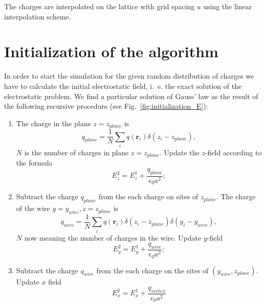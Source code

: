 \documentclass[a4paper, 12pt]{article}
\newcommand{\vect}[1]{\mathbf{#1}}
\begin{document}
The charges are interpolated on the lattice
with grid spacing $a$ using the linear interpolation scheme.
%
\section{Initialization of the algorithm}
%
In order to start the simulation for the given random distribution of
charges we have to calculate the initial electrostatic field, i.~e. the
exact solution of the electrostatic problem. We find a particular solution of Gauss' law as
the result of the following recursive procedure (see
Fig.~\ref{fig:initialization_E}):
\begin{enumerate}

\item The charge in the plane $z=z_{plane}$ is 
\begin{equation}
q_{plane}=\frac{1}{N}\sum_iq(\vect r_i)\delta(z_i-z_{plane}),
\end{equation}
$N$ is the number of charges in plane $z=z_{plane}$. Update the
$z$-field according to the formula
\begin{equation}
E_z^2=E_z^1+\frac{q_{plane}}{\epsilon_0a^2};
\end{equation}
 \item Subtract the
charge $q_{plane}$ from the each charge on sites of $z_{plane}$. The
charge of the wire $y=y_{wire}, z=z_{plane}$ is
\begin{equation}
q_{wire}=\frac{1}{N}\sum_iq(\vect r_i)\delta(z_i-z_{plane})\delta(y_i-y_{wire}),
\end{equation}
 $N$ now meaning the
number of charges in the wire. Update $y$-field
\begin{equation}
E_y^2=E_y^1+\frac{q_{wire}}{\epsilon_0a^2};
\end{equation}
\item Subtract the charge $q_{wire}$ from the each charge on the sites of
$(y_{wire},z_{plane})$. Update $x$ field 
\begin{equation}
E_x^2=E_x^1+\frac{q_{vertex}}{\epsilon_0a^2}
\end{equation}


\end{enumerate}
\end{document}
